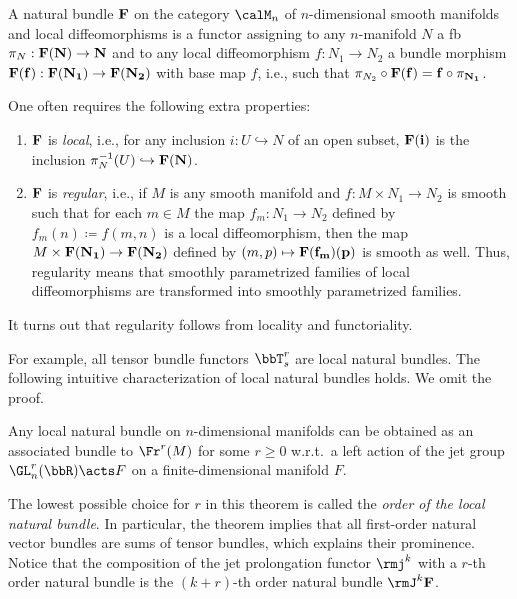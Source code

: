 \begin{defn}\label{def natural bundle}
    A natural bundle $\bf{F}$ on the category $\calM_n$ of $n$-dimensional smooth manifolds and local diffeomorphisms is a functor assigning to any $n$-manifold $N$ a \gls{fb} $\pi_N:\bf{F}(N)\to N$ and to any local diffeomorphism $f:N_1\to N_2$ a bundle morphism $\bf{F}(f):\bf{F}(N_1)\to \bf{F}(N_2)$ with base map $f$, i.e., such that $\pi_{N_2}\circ \bf{F}(f)=f\circ \pi_{N_1}$. 

    One often requires the following extra properties:
    \begin{enumerate}[label=(\alph*)]
        \item $\bf{F}$ is \emph{local}, i.e., for any inclusion $i:U\hookrightarrow N$ of an open subset, $\bf{F}(i)$ is the inclusion $\pi^{-1}_N(U)\hookrightarrow \bf{F}(N)$.
    
        \item $\bf{F}$ is \emph{regular}, i.e., if $M$ is any smooth manifold and $f:M\times N_1\to N_2$ is smooth such that for each $m\in M$ the map $f_m:N_1\to N_2$ defined by $f_m(n)\coloneqq f(m,n)$ is a local diffeomorphism, then the map $M\times \bf{F}(N_1)\to \bf{F}(N_2)$ defined by $(m,p)\mapsto \bf{F}(f_m)(p)$ is smooth as well. Thus, regularity means that smoothly parametrized families of local diffeomorphisms are transformed into smoothly parametrized families.
    \end{enumerate}
    It turns out that regularity follows from locality and functoriality.
\end{defn}

For example, all tensor bundle functors $\bbT^r_s$ are local natural bundles. The following intuitive characterization of local natural bundles holds. We omit the proof.

\begin{thm}\label{thm 1.2.8 Cap}
    Any local natural bundle on $n$-dimensional manifolds can be obtained as an associated bundle to $\Fr^r (M)$ for some $r\geq 0$ w.r.t.\ a left action of the jet group $\GL^r_n(\bbR)\acts F$ on a finite-dimensional manifold $F$.
\end{thm}

The lowest possible choice for $r$ in this theorem is called the \emph{order of the local natural bundle}. In particular, the theorem implies that all first-order natural vector bundles are sums of tensor bundles, which explains their prominence. Notice that the composition of the jet prolongation functor $\rmj^k$ with a $r$-th order natural bundle is the $(k+r)$-th order natural bundle $\rmJ^k \bf{F}$.

